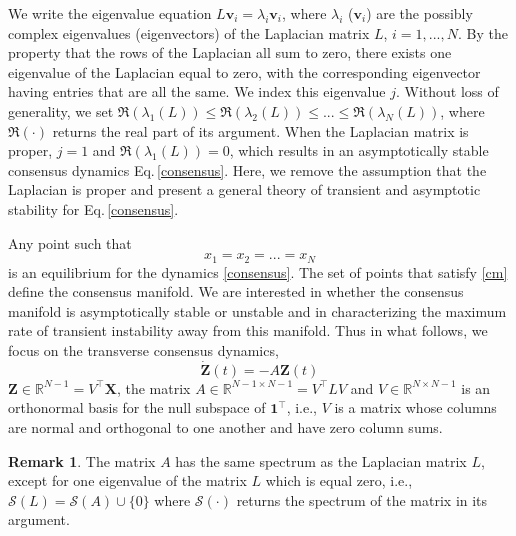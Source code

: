 \documentclass[%
 reprint,
 amsmath,amssymb,
 aip,
]{revtex4-2}
\def \bX {\pmb{X}}
\def \bZ {\pmb{Z}}
\def \bv {\pmb{v}}
\def \bone {\pmb{1}}
\theoremstyle{italichead}
\newtheorem{assumption}[theorem]{Assumption}
\theoremstyle{definition}
\newtheorem{remark}{Remark}
\begin{document}
{We write the eigenvalue equation $L \bv_i=\lambda_i \bv_i$, where $\lambda_i$  ($\bv_i$) are the possibly complex eigenvalues (eigenvectors) of the Laplacian matrix $L$, $i=1,...,N$. By the property that the rows of the Laplacian all sum to zero, there exists one eigenvalue of the Laplacian equal to zero, with the corresponding eigenvector having entries that are all the same. We index this eigenvalue $j$.
 Without loss of generality, we set $\Re(\lambda_1(L)) \leq \Re(\lambda_2(L)) \leq ... \leq \Re(\lambda_N(L))$,
where $\Re(\cdot)$ returns the real part of its argument. When the Laplacian matrix is proper, $j=1$ and $\Re(\lambda_1(L))=0$, which results in an asymptotically stable consensus dynamics Eq.\,\eqref{consensus}. Here, we remove the assumption that the Laplacian is proper and present a general theory of transient and asymptotic stability for Eq.\,\eqref{consensus}.


Any point such that
\begin{equation} \label{cm}
x_1=x_2=...=x_N
\end{equation}
is an equilibrium for the dynamics \eqref{consensus}. The set of points that satisfy \eqref{cm} define the consensus manifold. We are interested in whether the consensus manifold is asymptotically stable or unstable and in characterizing the maximum rate of transient instability away from this manifold. Thus in what follows, we focus on the transverse consensus dynamics,
\begin{equation}
\label{transverse}
    \dot{\bZ}(t) = -A \bZ(t)
\end{equation}
$\bZ \in \mathbb{R}^{N-1}=V^\top \bX$, the matrix $A \in \mathbb{R}^{N-1 \times N-1} =V^\top L V$
and $V \in \mathbb{R}^{N \times N-1}$ is an orthonormal basis for the null subspace of $\bone^\top$, i.e., $V$ is a matrix whose columns are normal and orthogonal to one another and have zero column sums.
\begin{remark}
The matrix $A$ has the same spectrum as the Laplacian matrix $L$, except for one eigenvalue of the matrix $L$ which is equal zero, i.e., $\mathcal{S}(L) = \mathcal{S}(A) \cup \{ 0 \}$ where $\mathcal{S}(\cdot)$ returns the spectrum of the matrix in its argument.
\end{remark}

}
\end{document}
